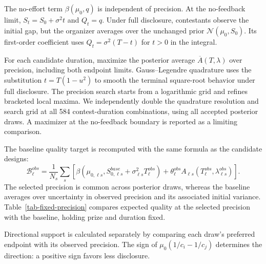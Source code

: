 \documentclass[mnsc]{informs3}
\begin{document}
\begin{APPENDICES}
The no-effort term $\beta(\mu_0,q)$ is independent of precision. At the no-feedback limit, $S_t=S_0+\sigma^2t$ and $Q_t=q$. Under full disclosure, contestants observe the initial gap, but the organizer averages over the unchanged prior $\mathcal N(\mu_0,S_0)$. Its first-order coefficient uses $Q_t=\sigma^2(T-t)$ for $t>0$ in the integral.

For each candidate duration, maximize the posterior average $\overline A(T,\lambda)$ over precision, including both endpoint limits. Gauss--Legendre quadrature uses the substitution $t=T(1-u^2)$ to smooth the terminal square-root behavior under full disclosure. The precision search starts from a logarithmic grid and refines bracketed local maxima. We independently double the quadrature resolution and search grid at all 584 contest-duration combinations, using all accepted posterior draws. A maximizer at the no-feedback boundary is reported as a limiting comparison.

The baseline quality target is recomputed with the same formula as the candidate designs:
\[
\mathcal B_\ell^{obs}
=\frac1{N_s}\sum_s\left[\beta(\mu_{0,\ell s},S_{0,\ell s}^{base}+\sigma_{\ell s}^2T_\ell^{obs})
+\theta_\ell^{obs}A_{\ell s}(T_\ell^{obs},\lambda_{\ell s}^{obs})\right].
\]
The selected precision is common across posterior draws, whereas the baseline averages over uncertainty in observed precision and its associated initial variance. Table~\ref{tab-fixed-precision} compares expected quality at the selected precision with the baseline, holding prize and duration fixed.

Directional support is calculated separately by comparing each draw's preferred endpoint with its observed precision. The sign of $\mu_0(1/c_i-1/c_j)$ determines the direction: a positive sign favors less disclosure.




\end{APPENDICES}
\end{document}
